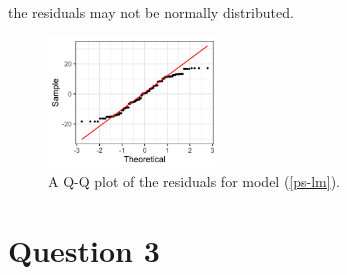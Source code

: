 \documentclass[10pt]{article}
\begin{document}
\begin{itemize}
    the residuals may not be normally distributed. 
    \begin{figure}
        \centering
        \includegraphics[width = 0.4\textwidth]{img/ps-qqnorm.png}
        \caption{A Q-Q plot of the residuals for model (\ref{ps-lm}).}
        \label{ps-qqplot}
    \end{figure}
\end{itemize}

\section{Question 3} \noindent
\end{document}
